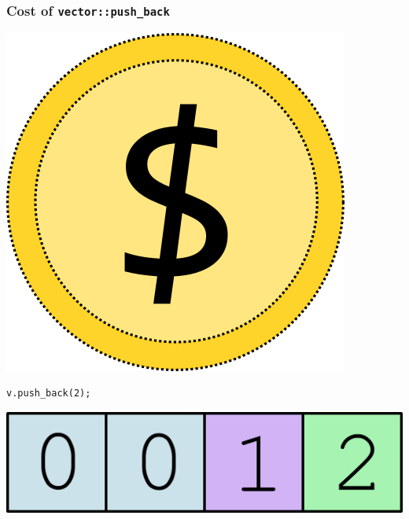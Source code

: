 \documentclass[aspectratio=169]{beamer}
\begin{document}
\begin{frame}[fragile]
  \frametitle{Cost of \texttt{vector::push\_back}}
  
  \includegraphics[width=.1\textwidth]{amortizedgfx/coin_01.png}
  
  \begin{lstlisting}[style=cpp20]
  v.push_back(2);
  \end{lstlisting}
  
  \begin{center}
  \includegraphics[width=.5\textwidth]{amortizedgfx/push_002.png}
  \end{center}
  
\end{frame}
\end{document}
